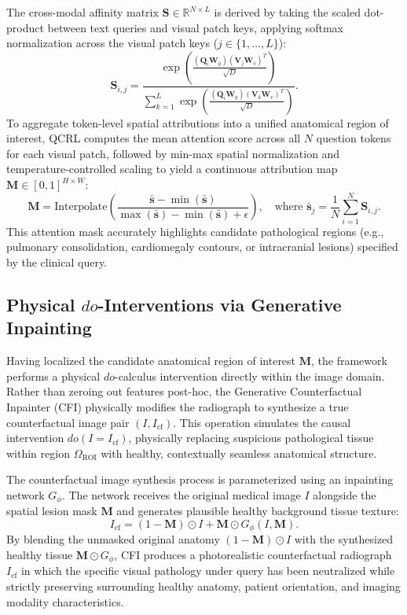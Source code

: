 \documentclass[journal,twoside,web]{ieeecolor}
\begin{document}
The cross-modal affinity matrix $\mathbf{S} \in \mathbb{R}^{N \times L}$ is derived by taking the scaled dot-product between text queries and visual patch keys, applying softmax normalization across the visual patch keys ($j \in \{1,\dots,L\}$):
\begin{equation}
\mathbf{S}_{i, j} = \frac{\exp\left( \frac{(\mathbf{Q}_i \mathbf{W}_q) (\mathbf{V}_j \mathbf{W}_v)^T}{\sqrt{D}} \right)}{\sum_{k=1}^L \exp\left( \frac{(\mathbf{Q}_i \mathbf{W}_q) (\mathbf{V}_k \mathbf{W}_v)^T}{\sqrt{D}} \right)}.
\label{eq:cross_attn}
\end{equation}
To aggregate token-level spatial attributions into a unified anatomical region of interest, QCRL computes the mean attention score across all $N$ question tokens for each visual patch, followed by min-max spatial normalization and temperature-controlled scaling to yield a continuous attribution map $\mathbf{M} \in [0, 1]^{H \times W}$:
\begin{equation}
\mathbf{M} = \text{Interpolate}\left( \frac{\bar{\mathbf{s}} - \min(\bar{\mathbf{s}})}{\max(\bar{\mathbf{s}}) - \min(\bar{\mathbf{s}}) + \epsilon} \right), \quad \text{where } \bar{\mathbf{s}}_j = \frac{1}{N} \sum_{i=1}^N \mathbf{S}_{i, j}.
\label{eq:spatial_mask}
\end{equation}
This attention mask accurately highlights candidate pathological regions (e.g., pulmonary consolidation, cardiomegaly contours, or intracranial lesions) specified by the clinical query.

\subsection{Physical $do$-Interventions via Generative Inpainting}
Having localized the candidate anatomical region of interest $\mathbf{M}$, the framework performs a physical $do$-calculus intervention directly within the image domain. Rather than zeroing out features post-hoc, the Generative Counterfactual Inpainter (CFI) physically modifies the radiograph to synthesize a true counterfactual image pair $(I, I_{\text{cf}})$. This operation simulates the causal intervention $do(I = I_{\text{cf}})$, physically replacing suspicious pathological tissue within region $\Omega_{\text{ROI}}$ with healthy, contextually seamless anatomical structure.

The counterfactual image synthesis process is parameterized using an inpainting network $G_{\phi}$. The network receives the original medical image $I$ alongside the spatial lesion mask $\mathbf{M}$ and generates plausible healthy background tissue texture:
\begin{equation}
I_{\text{cf}} = (1 - \mathbf{M}) \odot I + \mathbf{M} \odot G_{\phi}(I, \mathbf{M}).
\label{eq:inpainting}
\end{equation}
By blending the unmasked original anatomy $(1 - \mathbf{M}) \odot I$ with the synthesized healthy tissue $\mathbf{M} \odot G_{\phi}$, CFI produces a photorealistic counterfactual radiograph $I_{\text{cf}}$ in which the specific visual pathology under query has been neutralized while strictly preserving surrounding healthy anatomy, patient orientation, and imaging modality characteristics.
\end{document}
